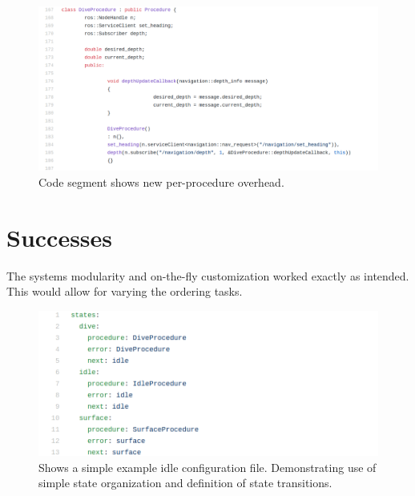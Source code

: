 \begin{figure}
\centering
\includegraphics[width=150mm]{Figures/NewProcedureOverhead}
\decoRule
\caption[New Procedure Overhead]{Code segment shows new per-procedure overhead.}
\label{fig:NewProcedureOverhead}
\end{figure}


\section{Successes}

The systems modularity and on-the-fly customization worked exactly as intended. This would allow for varying the ordering tasks.



\begin{figure}
\centering
\includegraphics[width=150mm]{Figures/ExampleConfig}
\decoRule
\caption[Example Configuration File]{Shows a simple example idle configuration file. Demonstrating use of simple state organization and definition of state transitions.}
\label{fig:ExampleConfig}
\end{figure}